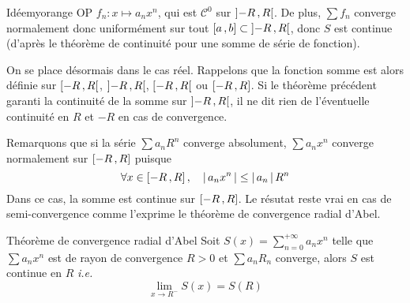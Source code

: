     \begin{demo}{Idée}{myorange}
        OP $f_n : x \mapsto a_n x^n$, qui est $\mathcal{C}^0$ sur $\left] -R \, , R \right[$. De plus, $\sum f_n$ converge normalement donc uniformément sur tout $\left[ a \, , b \right] \subset \left] -R \, , R \right[$, donc $S$ est continue (d’après le théorème de continuité pour une somme de série de fonction).
    \end{demo}

    On se place désormais dans le cas réel. Rappelons que la fonction somme est alors définie sur $\left[ -R \, , R \right[$, $\left] -R \, , R \right[$, $\left[ -R \, , R \right[$ ou $\left[ -R \, , R \right]$. Si le théorème précédent garanti la continuité de la somme sur $\left] -R \, , R \right[$, il ne dit rien de l’éventuelle continuité en $R$ et $-R$ en cas de convergence. 
    
    Remarquons que si la série $\sum a_n R^n$ converge absolument, $\sum a_n x^n$ converge normalement sur $\left[ -R \, , R \right]$ puisque 
    \[ \forall x \in \left[ -R \, , R \right], \quad \left\lvert \,a_n x^n \, \right\rvert \leq \left\lvert \,a_n \, \right\rvert R^n \]   
    Dans ce cas, la somme est continue sur $\left[ -R \, , R \right]$. Le résutat reste vrai en cas de semi-convergence comme l’exprime le théorème de convergence radial d’Abel.

    \begin{theo}{Théorème de convergence radial d’Abel}{}
        Soit $S(x) = \sum_{n=0}^{+\infty} a_n x^n$ telle que $\sum a_n x^n$ est de rayon de convergence $R > 0$ et $\sum a_n R_n$ converge, alors $S$ est continue en $R$ \textit{i.e.} 
        \[ \lim_{x \to R^-} S(x) = S(R) \]  
    \end{theo}

